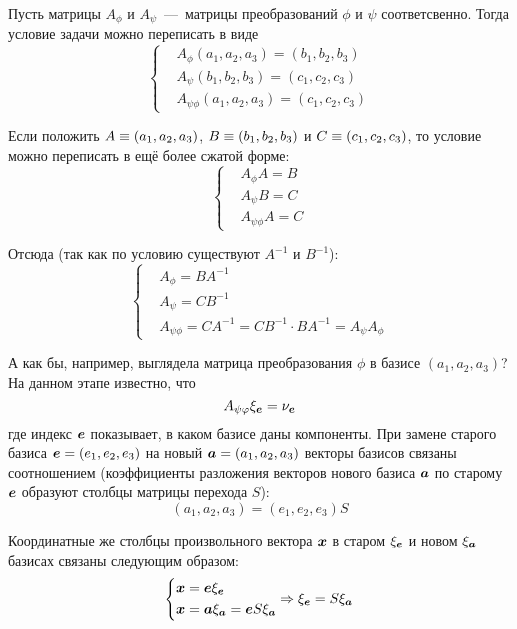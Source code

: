 \documentclass[a4paper,12pt]{article}
\begin{document}
  \begin{solution}
    Пусть матрицы $A_{\phi}$ и $A_{\psi}$~---~матрицы преобразований $\phi$ и $\psi$ соответсвенно.
    Тогда условие задачи можно переписать в виде
    \[
      \left\{
        \begin{aligned}
          &A_{\phi} (a_1, a_2, a_3) = (b_1, b_2, b_3)\\
          &A_{\psi} (b_1, b_2, b_3) = (c_1, c_2, c_3)\\
          &A_{\psi\phi} (a_1, a_2, a_3) = (c_1, c_2, c_3)
        \end{aligned}
      \right.
    \]
    
    Если положить $A \hm\equiv (a_1, a_2, a_3)$, $B \hm\equiv (b_1, b_2, b_3)$ и $C \hm\equiv (c_1, c_2, c_3)$, то условие можно переписать в ещё более сжатой форме:
    \[
      \left\{
        \begin{aligned}
          &A_{\phi} A = B\\
          &A_{\psi} B = C\\
          &A_{\psi\phi} A = C
        \end{aligned}
      \right.
    \]
    
    Отсюда (так как по условию существуют $A^{-1}$ и $B^{-1}$):
    \[
      \left\{
        \begin{aligned}
          &A_{\phi} = B A^{-1}\\
          &A_{\psi} = C B^{-1}\\
          &A_{\psi \phi} = C A^{-1} = CB^{-1} \cdot B A^{-1} = A_{\psi} A_{\phi}
        \end{aligned}
      \right.
    \]
    
    А как бы, например, выглядела матрица преобразования $\phi$ в базисе $(a_1, a_2, a_3)$?
    На данном этапе известно, что
    \[
      A_{\psi\varphi} \xi_{\boldsymbol e} = \nu_{\boldsymbol e}
    \]
    где индекс $\boldsymbol e$ показывает, в каком базисе даны компоненты.
    При замене старого базиса $\bds e \hm= (e_1, e_2, e_3)$ на новый $\bds a \hm= (a_1, a_2, a_3)$ векторы базисов связаны соотношением (коэффициенты разложения векторов нового базиса $\boldsymbol a$ по старому $\boldsymbol e$ образуют столбцы матрицы перехода $S$):
    \[
      (a_1, a_2, a_3) = (e_1, e_2, e_3) S
    \]
    
    Координатные же столбцы произвольного вектора $\boldsymbol x$ в старом $\xi_{\boldsymbol e}$ и новом $\xi_{\boldsymbol a}$ базисах связаны следующим образом:
    \[
      \left\{
        \begin{aligned}
          &\boldsymbol x = \boldsymbol e \xi_{\boldsymbol e}\\
          &\boldsymbol x = \boldsymbol a \xi_{\boldsymbol a} = \boldsymbol e S \xi_{\boldsymbol a}\\
        \end{aligned}
        \Rightarrow \xi_{\boldsymbol e} = S \xi_{\boldsymbol a}
      \right.
    \]
    

\end{solution}
\end{document}
